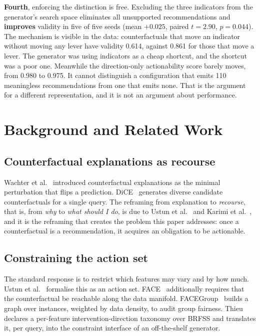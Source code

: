 \documentclass[conference]{IEEEtran}
\begin{document}
\textbf{Fourth}, enforcing the distinction is free. Excluding the three indicators from the generator's search space eliminates all unsupported recommendations and \textbf{improves} validity in five of five seeds (mean $+0.025$, paired $t=2.90$, $p=0.044$). The mechanism is visible in the data: counterfactuals that move an indicator without moving any lever have validity 0.614, against 0.861 for those that move a lever. The generator was using indicators as a cheap shortcut, and the shortcut was a poor one. Meanwhile the direction-only actionability score barely moves, from 0.980 to 0.975. It cannot distinguish a configuration that emits 110 meaningless recommendations from one that emits none. That is the argument for a different representation, and it is not an argument about performance.

\section{Background and Related Work}
\subsection{Counterfactual explanations as recourse}
Wachter et al.~\cite{wachter2017} introduced counterfactual explanations as the minimal perturbation that flips a prediction. DiCE~\cite{mothilal2020} generates diverse candidate counterfactuals for a single query. The reframing from explanation to \emph{recourse}, that is, from \emph{why} to \emph{what should I do}, is due to Ustun et al.~\cite{ustun2019} and Karimi et al.~\cite{karimi2021}, and it is the reframing that creates the problem this paper addresses: once a counterfactual is a recommendation, it acquires an obligation to be actionable.

\subsection{Constraining the action set}
The standard response is to restrict which features may vary and by how much. Ustun et al.~\cite{ustun2019} formalise this as an action set. FACE~\cite{poyiadzi2020} additionally requires that the counterfactual be reachable along the data manifold. FACEGroup~\cite{facegroup2025} builds a graph over instances, weighted by data density, to audit group fairness. Thieu~\cite{thieu2026} declares a per-feature intervention-direction taxonomy over BRFSS and translates it, per query, into the constraint interface of an off-the-shelf generator.
\end{document}
